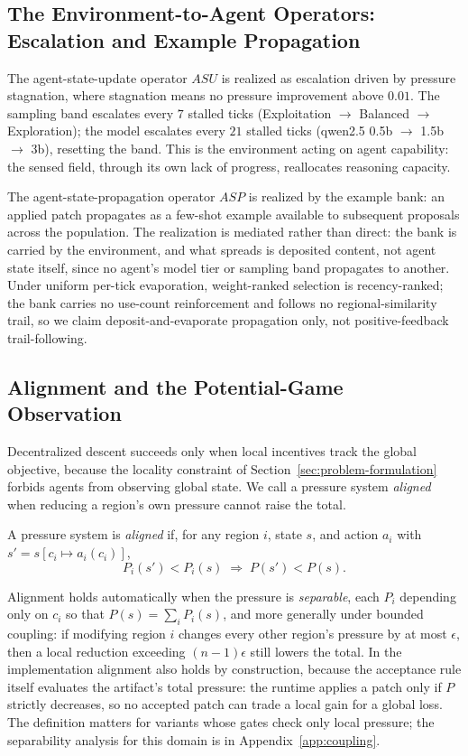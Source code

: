 \subsection{The Environment-to-Agent Operators: Escalation and Example Propagation}

The agent-state-update operator $ASU$ is realized as escalation driven by pressure stagnation, where stagnation means no pressure improvement above $0.01$. The sampling band escalates every $7$ stalled ticks (Exploitation $\to$ Balanced $\to$ Exploration); the model escalates every $21$ stalled ticks (qwen2.5 0.5b $\to$ 1.5b $\to$ 3b), resetting the band. This is the environment acting on agent capability: the sensed field, through its own lack of progress, reallocates reasoning capacity.

The agent-state-propagation operator $ASP$ is realized by the example bank: an applied patch propagates as a few-shot example available to subsequent proposals across the population. The realization is mediated rather than direct: the bank is carried by the environment, and what spreads is deposited content, not agent state itself, since no agent's model tier or sampling band propagates to another. Under uniform per-tick evaporation, weight-ranked selection is recency-ranked; the bank carries no use-count reinforcement and follows no regional-similarity trail, so we claim deposit-and-evaporate propagation only, not positive-feedback trail-following.

\subsection{Alignment and the Potential-Game Observation}

Decentralized descent succeeds only when local incentives track the global objective, because the locality constraint of Section~\ref{sec:problem-formulation} forbids agents from observing global state. We call a pressure system \emph{aligned} when reducing a region's own pressure cannot raise the total.

\begin{definition}
A pressure system is \emph{aligned} if, for any region $i$, state $s$, and action $a_i$ with $s' = s[c_i \mapsto a_i(c_i)]$,
\[
P_i(s') < P_i(s) \;\Longrightarrow\; P(s') < P(s).
\]
\end{definition}

Alignment holds automatically when the pressure is \emph{separable}, each $P_i$ depending only on $c_i$ so that $P(s) = \sum_i P_i(s)$, and more generally under bounded coupling: if modifying region $i$ changes every other region's pressure by at most $\epsilon$, then a local reduction exceeding $(n-1)\epsilon$ still lowers the total. In the implementation alignment also holds by construction, because the acceptance rule itself evaluates the artifact's total pressure: the runtime applies a patch only if $P$ strictly decreases, so no accepted patch can trade a local gain for a global loss. The definition matters for variants whose gates check only local pressure; the separability analysis for this domain is in Appendix~\ref{app:coupling}.

